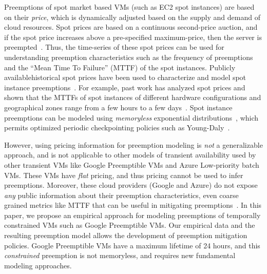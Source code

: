 Preemptions of spot market based VMs (such as EC2 spot instances) are based on their \emph{price}, which is dynamically adjusted based on the supply and demand of cloud resources. 
Spot prices are based on a continuous second-price auction, and if the spot price increases above a pre-specified maximum-price, then the server is preempted~\cite{spot-pricing2}.
%
Thus, the time-series of these spot prices can be used for understanding preemption characteristics such as the frequency of preemptions and the ``Mean Time To Failure'' (MTTF) of the spot instances. 
Publicly available\footnotemark historical spot prices have been used to characterize and model spot instance preemptions~\cite{spotcheck, bid-cloud, transient-guarantees, wolski2016providing}. %
For example, past work has analyzed spot prices and shown that the MTTFs of spot instances of different hardware configurations and geographical zones range from a few hours to a few days~\cite{wolski_probabilistic_2017, icdcs-spotlight, wolski2016providing, baughman2018predicting, wolski2017probabilistic}.
%
Spot instance preemptions can be modeled using \emph{memoryless}  exponential distributions~\cite{bid-cloud, hotcloud-not-bid, flint, ghit-spark-hpdc, chien-ic2e19}, which permits optimized periodic checkpointing policies such as Young-Daly~\cite{daly2006higher}. 



However, using pricing information for preemption modeling is \emph{not} a generalizable approach, and is not applicable to other models of transient availability used by other transient VMs like Google Preemptible VMs and Azure Low-priority batch VMs. 
%
These VMs have \emph{flat} pricing, and thus pricing cannot be used to infer preemptions. 
%
Moreover, these cloud providers (Google and Azure) do not expose \emph{any} public information about their preemption characteristics, even coarse grained metrics like MTTF that can be useful in mitigating preemptions~\cite{chien-ic2e19}. 
%
%
In this paper, we propose an empirical approach for modeling preemptions of temporally constrained VMs such as Google Preemptible VMs.
%
Our empirical data and the resulting preemption model allows the development of preemption mitigation policies. 
%
Google Preemptible VMs have a maximum lifetime of 24 hours, and this \emph{constrained} preemption is not memoryless, and requires new fundamental modeling approaches. 





